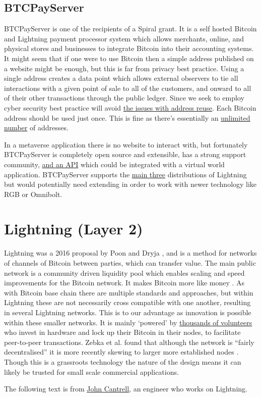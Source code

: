\subsection{BTCPayServer}
BTCPayServer is one of the recipients of a Spiral grant. It is a self hosted Bitcoin and Lightning payment processor system which allows merchants, online, and physical stores and businesses to integrate Bitcoin into their accounting systems. It might seem that if one were to use Bitcoin then a simple address published on a website might be enough, but this is far from privacy best practice. Using a single address creates a data point which allows external observers to tie all interactions with a given point of sale to all of the customers, and onward to all of their other transactions through the public ledger. Since we seek to employ cyber security best practice will avoid \href{https://en.bitcoin.it/wiki/Address_reuse}{the issues with address reuse}. Each Bitcoin address should be used just once. This is fine as there's essentially an \href{https://privacypros.io/btc-faq/how-many-btc-addresses}{unlimited number} of addresses.\par
In a metaverse application there is no website to interact with, but fortunately BTCPayServer is completely open source and extensible, has a strong support community, \href{https://docs.btcpayserver.org/API/Greenfield/v1/#operation/Invoices_CreateInvoice}{and an API} which could be integrated with a virtual world application. 
BTCPayServer supports the \href{https://docs.btcpayserver.org/LightningNetwork/}{main three} distributions of Lightning but would potentially need extending in order to work with newer technology like RGB or Omnibolt.
\section{Lightning (Layer 2)}
Lightning was a 2016 proposal by Poon and Dryja \cite{poon2016bitcoin}, and is a method for networks of channels of Bitcoin between parties, which can transfer value. The main public network is a community driven liquidity pool which enables scaling and speed improvements for the Bitcoin network. It makes Bitcoin more like money \cite{divakaruni2022lightning}. As with Bitcoin base chain there are multiple standards and approaches, but within Lightning these are not necessarily cross compatible with one another, resulting in several Lightning networks. This is to our advantage as innovation is possible within these smaller networks. It is mainly `powered' by \href{https://plebnet.wiki/wiki/Main_Page}{thousands of volunteers} who invest in hardware and lock up their Bitcoin in their nodes, to facilitate peer-to-peer transactions. Zebka et al. found that although the network is ``fairly decentralised'' it is more recently skewing to larger more established nodes \cite{zabka2022short}. Though this is a grassroots technology the nature of the design means it can likely be trusted for small scale commercial applications.\par
The following text is from \href{https://medium.com/@johncantrell97?p=5cc72f2c664}{John Cantrell}, an engineer who works on Lightning.\par

